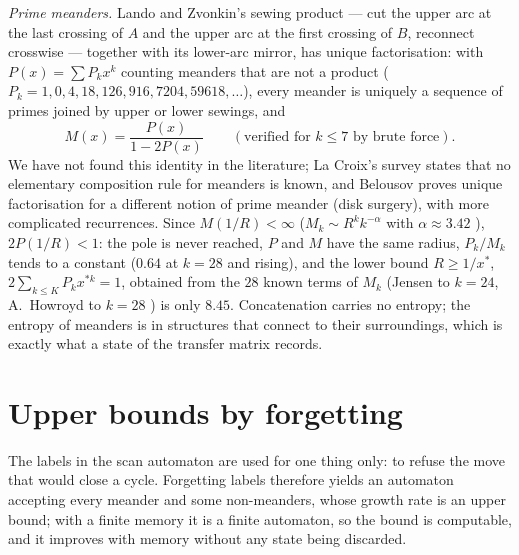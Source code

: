 \documentclass[11pt]{amsart}
\theoremstyle{definition}
\begin{document}
\emph{Prime meanders.} Lando and Zvonkin's sewing product \cite{LandoZvonkin} --- cut the upper arc at the last crossing of $A$ and the upper arc at the first crossing of $B$, reconnect crosswise --- together with its lower-arc mirror, has unique factorisation: with $P(x)=\sum P_kx^k$ counting meanders that are not a product ($P_k=1,0,4,18,126,916,7204,59618,\dots$), every meander is uniquely a sequence of primes joined by upper or lower sewings, and
\begin{equation}\label{eq:prime}
M(x)=\frac{P(x)}{1-2P(x)}\qquad(\text{verified for }k\le7\text{ by brute force}).
\end{equation}
We have not found this identity in the literature; La Croix's survey \cite{LaCroix} states that no elementary composition rule for meanders is known, and Belousov \cite{Belousov} proves unique factorisation for a different notion of prime meander (disk surgery), with more complicated recurrences. Since $M(1/R)<\infty$ ($M_k\sim R^kk^{-\alpha}$ with $\alpha\approx3.42$ \cite{DFGG00,JensenGuttmann}), $2P(1/R)<1$: the pole is never reached, $P$ and $M$ have the same radius, $P_k/M_k$ tends to a constant ($0.64$ at $k=28$ and rising), and the lower bound $R\ge1/x^*$, $2\sum_{k\le K}P_kx^{*k}=1$, obtained from the $28$ known terms of $M_k$ (Jensen \cite{Jensen2000} to $k=24$, A.~Howroyd to $k=28$ \cite{OEIS}) is only $8.45$. Concatenation carries no entropy; the entropy of meanders is in structures that connect to their surroundings, which is exactly what a state of the transfer matrix records.

\section{Upper bounds by forgetting}\label{sec:upper}

The labels in the scan automaton are used for one thing only: to refuse the move that would close a cycle. Forgetting labels therefore yields an automaton accepting every meander and some non-meanders, whose growth rate is an upper bound; with a finite memory it is a finite automaton, so the bound is computable, and it improves with memory without any state being discarded.
\end{document}

